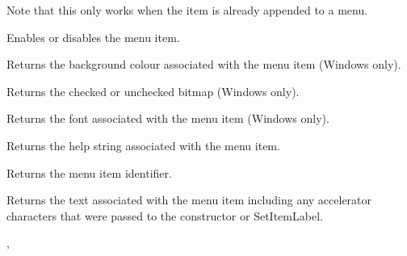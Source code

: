 Note that this only works when the item is already appended to a menu.


\label{wxmenuitemenable}


Enables or disables the menu item.


\label{wxmenuitemgetbackgroundcolour}


Returns the background colour associated with the menu item (Windows only).


\label{wxmenuitemgetbitmap}


Returns the checked or unchecked bitmap (Windows only).


\label{wxmenuitemgetfont}


Returns the font associated with the menu item (Windows only).


\label{wxmenuitemgethelp}


Returns the help string associated with the menu item.


\label{wxmenuitemgetid}


Returns the menu item identifier.

\label{wxmenuitemgetitemlabel}


Returns the text associated with the menu item including any accelerator
characters that were passed to the constructor or SetItemLabel.


, 


\label{wxmenuitemgetitemlabeltext}


